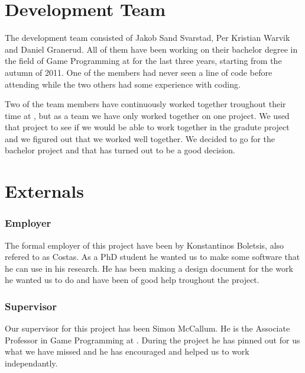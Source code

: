 \chapter{Development Team}
The development team consisted of Jakob Sand Svarstad, Per Kristian Warvik and Daniel Granerud.
All of them have been working on their bachelor degree in the field of Game Programming at \GUC{} for the last three years, starting from the autumn of 2011. One of the members had never seen a line of code before attending \GUC{} while the two others had some experience with coding.

Two of the team members have continuously worked together troughout their time at \GUC{}, but as a team we have only worked together on one project. We used that project to see if we would be able to work together in the gradute project and we figured out that we worked well together. We decided to go for the bachelor project and that has turned out to be a good decision.

\chapter{Externals}

\subsection{Employer}
The formal employer of this project have been \GUC{} by Konstantinos Boletsis, also refered to as Costas. As a PhD student he wanted us to make some software that he can use in his research. He has been making a design document for the work he wanted us to do and have been of good help troughout the project.

\subsection{Supervisor}
Our supervisor for this project has been Simon McCallum. He is the Associate Professor in Game Programming at \GUC{}. During the project he has pinned out for us what we have missed and he has encouraged and helped us to work independantly.



